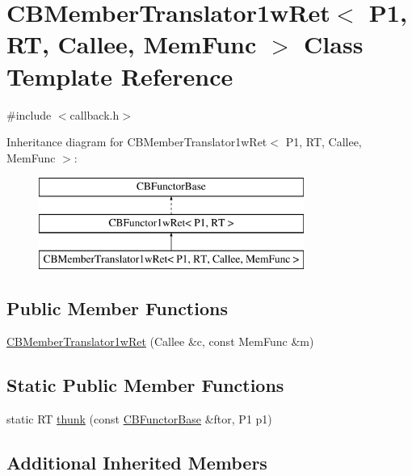 \hypertarget{class_c_b_member_translator1w_ret}{\section{C\+B\+Member\+Translator1w\+Ret$<$ P1, R\+T, Callee, Mem\+Func $>$ Class Template Reference}
\label{class_c_b_member_translator1w_ret}
}


{\ttfamily \#include $<$callback.\+h$>$}

Inheritance diagram for C\+B\+Member\+Translator1w\+Ret$<$ P1, R\+T, Callee, Mem\+Func $>$\+:\begin{figure}[H]
\begin{center}
\leavevmode
\includegraphics[height=3.000000cm]{class_c_b_member_translator1w_ret}
\end{center}
\end{figure}
\subsection*{Public Member Functions}
\begin{DoxyCompactItemize}
\item 
\hyperlink{class_c_b_member_translator1w_ret_a38d17dfd10f274c581873edf4886c606}{C\+B\+Member\+Translator1w\+Ret} (Callee \&c, const Mem\+Func \&m)
\end{DoxyCompactItemize}
\subsection*{Static Public Member Functions}
\begin{DoxyCompactItemize}
\item 
static R\+T \hyperlink{class_c_b_member_translator1w_ret_ae2177eab2be5fd4837cb63cc35252a00}{thunk} (const \hyperlink{class_c_b_functor_base}{C\+B\+Functor\+Base} \&ftor, P1 p1)
\end{DoxyCompactItemize}
\subsection*{Additional Inherited Members}


